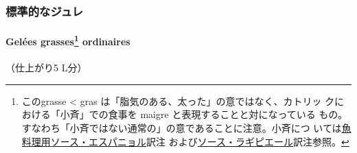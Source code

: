 \begin{recette}
\hypertarget{ux6a19ux6e96ux7684ux306aux30b8ux30e5ux30ec}{%
\subsubsection{標準的なジュレ}\label{ux6a19ux6e96ux7684ux306aux30b8ux30e5ux30ec}}

\hypertarget{gelee-grasse-ordinaire}{%
\paragraph[Gelées grasses ordinaires]{\texorpdfstring{Gelées
grasses\footnote{このgrasse \textless{} gras
  は「脂気のある、太った」の意ではなく、カトリッ
  クにおける「小斉」での食事を maigre と表現することと対になっている
  もの。すなわち「小斉ではない通常の」の意であることに注意。小斉につ
  いては\protect\hyperlink{sauce-espagnole-maigre}{魚料理用ソース・エスパニョル}訳注
  および\protect\hyperlink{sauce-laguipiere}{ソース・ラギピエール}訳注参照。}
ordinaires}{Gelées grasses ordinaires}}\label{gelee-grasse-ordinaire}}


（仕上がり5 L分）


\end{recette}
